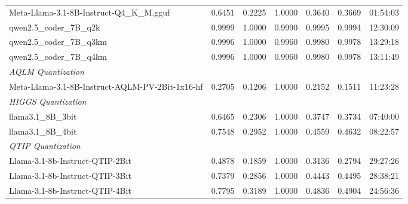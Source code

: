 \begin{table}[htbp]
{\begin{tabular}{lrrrrrr}
    Meta-Llama-3.1-8B-Instruct-Q4\_K\_M.gguf & 0.6451 & 0.2225 & 1.0000 & 0.3640 & 0.3669 & 01:54:03 \\
    qwen2.5\_coder\_7B\_q2k & 0.9999 & 1.0000 & 0.9990 & 0.9995 & 0.9994 & 12:30:09 \\
    qwen2.5\_coder\_7B\_q3km & 0.9996 & 1.0000 & 0.9960 & 0.9980 & 0.9978 & 13:29:18 \\
    qwen2.5\_coder\_7B\_q4km & 0.9996 & 1.0000 & 0.9960 & 0.9980 & 0.9978 & 13:11:49 \\
    \midrule
    \multicolumn{7}{l}{\textit{AQLM Quantization}} \\
    \midrule
    Meta-Llama-3.1-8B-Instruct-AQLM-PV-2Bit-1x16-hf & 0.2705 & 0.1206 & 1.0000 & 0.2152 & 0.1511 & 11:23:28 \\
    \midrule
    \multicolumn{7}{l}{\textit{HIGGS Quantization}} \\
    \midrule
    llama3.1\_8B\_3bit & 0.6465 & 0.2306 & 1.0000 & 0.3747 & 0.3734 & 07:40:00 \\
    llama3.1\_8B\_4bit & 0.7548 & 0.2952 & 1.0000 & 0.4559 & 0.4632 & 08:22:57 \\
    \midrule
    \multicolumn{7}{l}{\textit{QTIP Quantization}} \\
    \midrule
    Llama-3.1-8b-Instruct-QTIP-2Bit & 0.4878 & 0.1859 & 1.0000 & 0.3136 & 0.2794 & 29:27:26 \\
    Llama-3.1-8b-Instruct-QTIP-3Bit & 0.7379 & 0.2856 & 1.0000 & 0.4443 & 0.4495 & 28:38:21 \\
    Llama-3.1-8b-Instruct-QTIP-4Bit & 0.7795 & 0.3189 & 1.0000 & 0.4836 & 0.4904 & 24:56:36 \\
    \bottomrule
  \end{tabular}
  }
\end{table}

